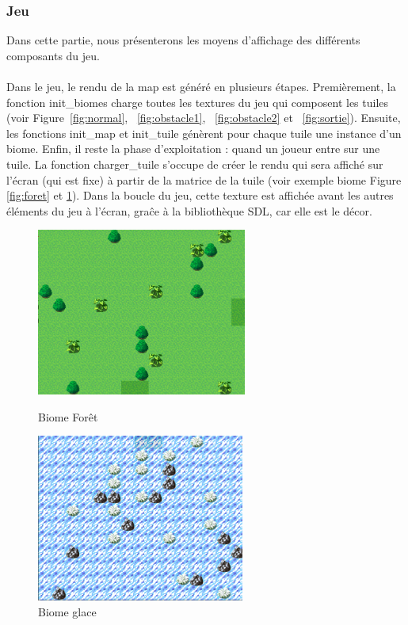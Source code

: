 \documentclass[11pt]{article}
\begin{document}
            \subsubsection{Jeu}
            Dans cette partie, nous présenterons les moyens d’affichage des différents composants du jeu.\\\\
            Dans le jeu, le rendu de la map est généré en plusieurs étapes. Premièrement, la fonction init\_biomes charge toutes les textures du jeu
            qui composent les tuiles (voir Figure~\ref{fig:normal}, ~\ref{fig:obstacle1}, ~\ref{fig:obstacle2} et ~\ref{fig:sortie}). Ensuite, les fonctions init\_map et init\_tuile génèrent pour chaque tuile une instance d’un biome. Enfin, il reste la phase d’exploitation : 
            quand un joueur entre sur une tuile. La fonction charger\_tuile s’occupe de créer le rendu qui sera affiché sur l’écran (qui est fixe) 
            à partir de la matrice de la tuile (voir exemple biome Figure \ref{fig:foret} et \ref{fig:glace}).
            Dans la boucle du jeu, cette texture est affichée avant les autres éléments du jeu à l’écran, graĉe à la bibliothèque SDL, car elle est le décor.\\
            \begin{figure}[H]
                \centering
                \begin{minipage}{0.45\textwidth}
                    \centering
                    \includegraphics[height=5.5cm]{biomeForet.png}
                    \caption{Biome Forêt}
                    \label{fig:foret}
                \end{minipage}
                \hfill
                \begin{minipage}{0.45\textwidth}
                    \centering
                    \includegraphics[height=5.5cm]{biomeGlace.png}
                    \caption{Biome glace}
                    \label{fig:glace}
                \end{minipage}
            \end{figure}
\end{document}
